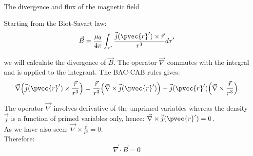 %
%
%

\begin{frame}{The divergence and flux of the magnetic field}

Starting from the Biot-Savart law:
\begin{equation*}
        \vec{B} =
          \frac{\mu_0}{4\pi} \int_{\tau^{\prime}}
             \frac{\vec{j}(\pvec{r}') \times \vec{r}}{r^{3}} d\tau^{\prime}
\end{equation*}

we will calculate the divergence of $\vec{B}$.
The operator $\vec{\nabla}$ commutes with the integral and is applied to the integrant.
The BAC-CAB rules gives:
\begin{equation*}
         \vec{\nabla} \Big( \vec{j}(\pvec{r}') \times \frac{\vec{r}}{r^{3}} \Big) =
         \frac{\vec{r}}{r^{3}} \Big( \vec{\nabla} \times \vec{j}(\pvec{r}') \Big) -
         \vec{j}(\pvec{r}') \Big( \vec{\nabla} \times \frac{\vec{r}}{r^{3}} \Big)
\end{equation*}

The operator $\vec{\nabla}$ involves derivative of the unprimed variables
whereas the density $\vec{j}$ is a function of primed variables only, hence:
$\vec{\nabla} \times \vec{j}(\pvec{r}') = 0$.\\
\vspace{0.1cm}
As we have also seen:
$\vec{\nabla} \times \frac{\vec{r}}{r^{3}} = 0$.\\
\vspace{0.1cm}
Therefore:
\begin{equation*}
         \vec{\nabla} \cdot \vec{B} =  0
\end{equation*}

\end{frame}

%
%
%

